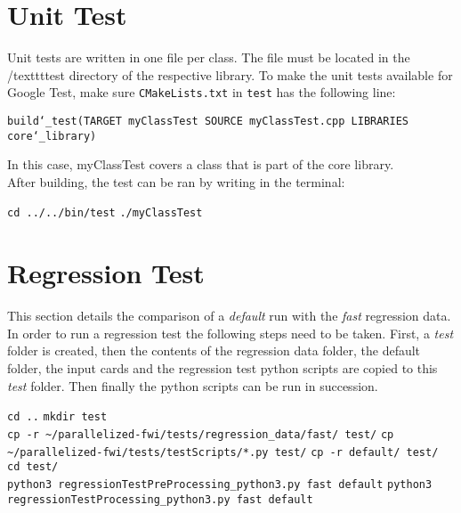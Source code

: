 \documentclass[10pt]{article}
\begin{document}
\section{Unit Test}

Unit tests are written in one file per class. The file must be located in the /texttt{test} directory of the respective library. To make the unit tests available for Google Test, make sure \texttt{CMakeLists.txt} in \texttt{test} has the following line:
\newline

\texttt{build\char`_test(TARGET myClassTest SOURCE myClassTest.cpp LIBRARIES core\char`_library)}
\newline

In this case, myClassTest covers a class that is part of the core library.\\
After building, the test can be ran by writing in the terminal:\\
\newline

\texttt{cd ../../bin/test}
\newline
\texttt{./myClassTest}
\newline

\section{Regression Test}
This section details the comparison of a \textit{default} run with the \textit{fast} regression data. In order to run a regression test the following steps need to be taken. First, a \textit{test} folder is created, then the contents of the regression data folder, the default folder, the input cards and the regression test python scripts are copied to this \textit{test} folder. Then finally the python scripts can be run in succession.  
\newline

\texttt{cd ..}
\newline
\texttt{mkdir test}
\\
\texttt{cp -r \textasciitilde/parallelized-fwi/tests/regression\_data/fast/ test/}
\newline
\texttt{cp \textasciitilde/parallelized-fwi/tests/testScripts/*.py test/}
\newline
\texttt{cp -r default/ test/}
\\
\texttt{cd test/}
\\
\texttt{python3 regressionTestPreProcessing\_python3.py fast default}
\newline
\texttt{python3 regressionTestProcessing\_python3.py fast default}
\end{document}
